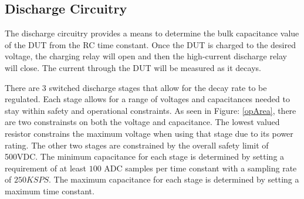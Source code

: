 \subsection{Discharge Circuitry}
The discharge circuitry provides a means to determine the bulk capacitance value of the DUT from the RC time constant. Once the DUT is charged to the desired voltage, the charging relay will open and then the high-current discharge relay will close. The current through the DUT will be measured as it decays.

There are 3 switched discharge stages that allow for the decay rate to be regulated. Each stage allows for a range of voltages and capacitances needed to stay within safety and operational constraints. As seen in Figure: \ref{opArea}, there are two constrainsts on both the voltage and capacitance. The lowest valued resistor constrains the maximum voltage when using that stage due to its power rating. The other two stages are constrained by the overall safety limit of 500VDC. The minimum capacitance for each stage is determined by setting a requirement of at least $100$ ADC samples per time constant with a sampling rate of $250KSPS$. The maximum capacitance for each stage is determined by setting a maximum time constant.


